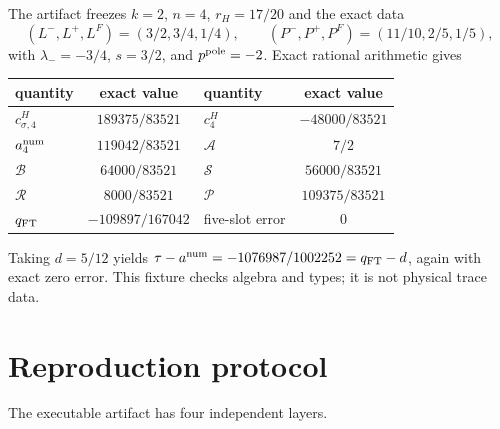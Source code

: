 \documentclass[11pt]{article}
\theoremstyle{remark}
\newcommand{\cA}{\mathcal A}
\newcommand{\cB}{\mathcal B}
\newcommand{\cP}{\mathcal P}
\newcommand{\cR}{\mathcal R}
\newcommand{\cS}{\mathcal S}
\begin{document}
The artifact freezes $k=2$, $n=4$, $r_H=17/20$ and the exact data
\[
 (L^-,L^+,L^F)=(3/2,3/4,1/4),\qquad
 (P^-,P^+,P^F)=(11/10,2/5,1/5),
\]
with $\lambda_-=-3/4$, $s=3/2$, and $p^{\rm pole}=-2$.  Exact rational
arithmetic gives
\begin{center}\small
\begin{tabular}{lc@{\qquad}lc}
\toprule
quantity & exact value & quantity & exact value\\
\midrule
$c^H_{\sigma,4}$ & $189375/83521$ & $c^H_4$ & $-48000/83521$\\
$a_4^{\rm num}$ & $119042/83521$ & $\cA$ & $7/2$\\
$\cB$ & $64000/83521$ & $\cS$ & $56000/83521$\\
$\cR$ & $8000/83521$ & $\cP$ & $109375/83521$\\
$q_{\rm FT}$ & $-109897/167042$ & five-slot error & $0$\\
\bottomrule
\end{tabular}
\end{center}
Taking $d=5/12$ yields
$\tau-a^{\rm num}=-1076987/1002252=q_{\rm FT}-d$, again with exact zero
error.  This fixture checks algebra and types; it is not physical trace data.

\section{Reproduction protocol}

The executable artifact has four independent layers.
\end{document}
